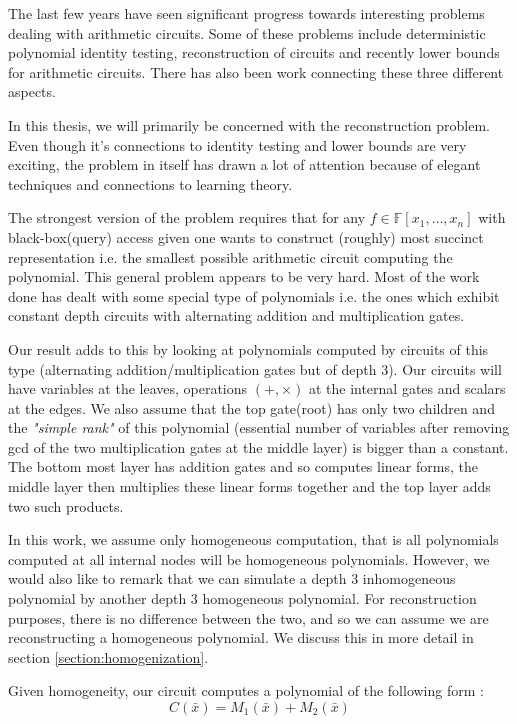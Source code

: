 \documentclass[12pt]{caltech_thesis}
\theoremstyle{plain}
\theoremstyle{definition}
\newcommand{\F}{\mathbb{F}}
\newcommand{\B}[1]{\bar{#1}}
\begin{document}
The last few years have seen significant progress towards interesting problems dealing with arithmetic circuits.
Some of these problems include deterministic polynomial identity testing, reconstruction of circuits and
recently lower bounds for arithmetic circuits. There has also been work connecting these three different
aspects. 

In this thesis, we will primarily be concerned with the reconstruction problem.
Even though it's connections to identity testing and lower bounds are very exciting, the problem
in itself has drawn a lot of attention because of elegant techniques and connections to learning theory.

The strongest version of the problem requires that for any $f \in
\F[x_1,\ldots,x_n]$ with black-box(query) access given one wants to construct (roughly)
most succinct representation i.e. the smallest possible arithmetic circuit computing the polynomial. This general
problem appears to be very hard. Most of the work done has dealt with some special type of polynomials i.e. the ones
which exhibit constant depth circuits with alternating addition and
multiplication gates. 

Our result adds to this by looking at polynomials computed by circuits of this type (alternating addition/multiplication
gates but of depth $3$). Our circuits will have variables at the leaves, operations $(+,\times)$ at the internal gates and scalars at the edges.
We also assume that the top gate(root) has only two children and the \emph{"simple rank"} of this polynomial (essential number of variables
after removing gcd of the two multiplication gates at the middle layer) is bigger than a constant. The bottom most layer has addition gates and so computes 
linear forms, the middle layer then multiplies these
linear forms together and the top layer adds two such products. 

In this work, we assume only homogeneous computation, that is all polynomials 
computed at all internal nodes will be homogeneous polynomials. 
However, we would also like to remark that we can simulate a depth $3$ inhomogeneous polynomial by another depth $3$ homogeneous polynomial.  
For reconstruction purposes, there is no difference between the two, and so we can assume we are reconstructing a homogeneous polynomial. 
We discuss this in more detail in section \ref{section:homogenization}. 

Given homogeneity, our circuit computes a polynomial of the following form :
\[
 C(\B x) =  M_1 (\B x) + M_2 (\B x)
\]
\end{document}
